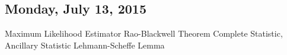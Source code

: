 \subsection{Monday, July 13, 2015}

Maximum Likelihood Estimator
Rao-Blackwell Theorem
Complete Statistic, Ancillary Statistic
Lehmann-Scheffe Lemma
